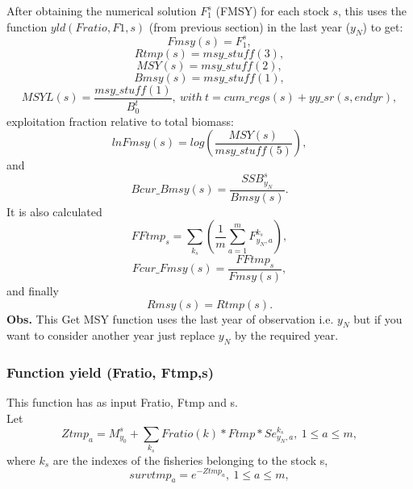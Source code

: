 \documentclass{article}
\begin{document}
After obtaining the numerical solution $F_1^s$ (FMSY) for each stock $s$, this uses the function $yld(Fratio, F1,s)$ (from previous section) in the last year ($y_N$) to get:
\begin{equation}
    Fmsy(s)=F_1^s,
\end{equation}
\begin{equation}
    Rtmp(s)=msy\_stuff(3),
\end{equation}
\begin{equation}
    MSY(s)=msy\_stuff(2),
\end{equation}
\begin{equation}
    Bmsy(s)=msy\_stuff(1),
\end{equation}
\begin{equation}
    MSYL(s)=\dfrac{msy\_stuff(1)}{B_0^t},\ with \ t=cum\_regs(s)+yy\_sr(s,endyr),
\end{equation}
exploitation fraction relative to total biomass:
\begin{equation}
    lnFmsy(s)   = log\left(\dfrac{MSY(s)}{msy\_stuff(5)}\right),
\end{equation}
and
\begin{equation}
    Bcur\_Bmsy(s)= \dfrac{SSB^s_{y_N}}{Bmsy(s)}.
\end{equation}
It is also calculated
\begin{equation}
    FFtmp_s=\sum_{k_s}\left(\dfrac{1}{m}\sum_{a=1}^mF^{k_s}_{y_N,a}\right),
\end{equation}
\begin{equation}
    Fcur\_Fmsy(s)= \dfrac{FFtmp_s}{Fmsy(s)},
\end{equation}
and finally
\begin{equation}
    Rmsy(s)     = Rtmp(s).
\end{equation}
\textbf{Obs.} This Get MSY function uses the last year of observation i.e. $y_N$ but if you want to consider another year just replace $y_N$ by the required year.

\subsubsection{Function yield (Fratio, Ftmp,s)} 
This function has as input Fratio, Ftmp and s.\\
Let
\begin{equation}
    Ztmp_a=M^s_{y_0}+\sum_{k_s}Fratio(k)*Ftmp*Se^{k_s}_{y_N,a}, \ 1\leq a \leq m, 
\end{equation}
where $k_s$ are the indexes of the fisheries belonging to the stock s,
\begin{equation}
    survtmp_a=e^{-Ztmp_a}, \ 1\leq a \leq m,
\end{equation}
\end{document}
